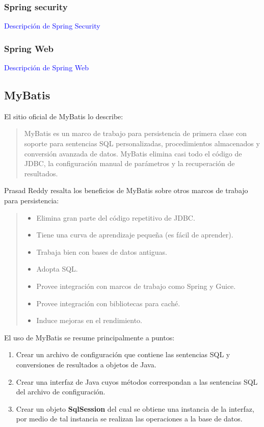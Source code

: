 \subsubsection{Spring security}\label{sec-spring-security}
\textcolor{blue}{Descripción de Spring Security}\cite{ProSpringSecurity}

\subsubsection{Spring Web}\label{sec-spring-web}
\textcolor{blue}{Descripción de Spring Web}\cite{SpringInAction}

\subsection{MyBatis}\label{sec-mybatis}
El sitio oficial de MyBatis\cite{MyBatis} lo describe: 
\begin{quote}
MyBatis es un marco de trabajo para persistencia de primera clase con soporte para sentencias SQL personalizadas, procedimientos almacenados y conversión avanzada de datos. MyBatis elimina casi todo el código de JDBC, la configuración manual de parámetros y la recuperación de resultados.
\end{quote}

Prasad Reddy\cite{PersistenceWithMyBatis} resalta los beneficios de MyBatis sobre otros marcos de trabajo para persistencia:
\begin{quote}
	\begin{itemize}
		\item Elimina gran parte del código repetitivo de JDBC.
		\item Tiene una curva de aprendizaje pequeña (es fácil de aprender).
		\item Trabaja bien con bases de datos antiguas.
		\item Adopta SQL.
		\item Provee integración con marcos de trabajo como Spring y Guice.
		\item Provee integración con bibliotecas para caché.
		\item Induce mejoras en el rendimiento.
	\end{itemize}
\end{quote}

El uso de MyBatis se resume principalmente a puntos\cite{PersistenceWithMyBatis}:
\begin{enumerate}
	\item Crear un archivo de configuración que contiene las sentencias SQL y conversiones de resultados a objetos de Java.
	\item Crear una interfaz de Java cuyos métodos correspondan a las sentencias SQL del archivo de configuración.
	\item Crear un objeto \textbf{SqlSession} del cual se obtiene una instancia de la interfaz, por medio de tal instancia se realizan las operaciones a la base de datos.
\end{enumerate}

